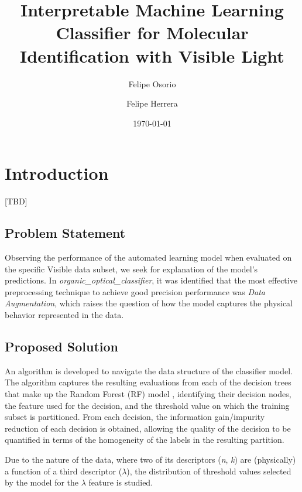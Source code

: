 \documentclass[preprint,superscriptaddress,preprintnumbers,aps,amsmath,amssymb]{revtex4}
\begin{document}
\title{Interpretable Machine Learning Classifier for Molecular Identification with Visible Light}
\author{Felipe Osorio}
\author{Felipe Herrera}
\date{\today}

\maketitle

\section{Introduction}
 [TBD] \\

\subsection*{Problem Statement}
Observing the performance of the automated learning model when evaluated on the specific Visible data subset, we seek for explanation of the model's predictions. In \textit{organic\_optical\_classifier}, it was identified that the most effective preprocessing technique to achieve good precision performance was \textit{Data Augmentation}, which raises the question of how the model captures the physical behavior represented in the data.

\subsection*{Proposed Solution}
An algorithm is developed to navigate the data structure of the classifier model. The algorithm captures the resulting evaluations from each of the decision trees that make up the Random Forest (RF) model \cite{Breiman2001}, identifying their decision nodes, the feature used for the decision, and the threshold value on which the training subset is partitioned. From each decision, the information gain/impurity reduction of each decision is obtained, allowing the quality of the decision to be quantified in terms of the homogeneity of the labels in the resulting partition.

Due to the nature of the data, where two of its descriptors (\textit{n}, \textit{k}) are (physically) a function of a third descriptor (\(\lambda\)), the distribution of threshold values selected by the model for the \(\lambda\) feature is studied.
\end{document}
